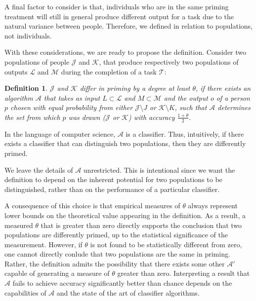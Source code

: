 \documentclass[a4paper]{report}
\newtheorem*{mydef}{Definition}
\begin{document}
A final factor to consider is that, individuals who are in the same priming 
treatment will still in general produce different output for a task
due to the natural variance between people.  Therefore, we defined in relation 
to populations, not individuals.

With these considerations, we are ready to propose the definition.
Consider two populations of people $\mathcal{J}$ and $\mathcal{K}$, that 
produce respectively two populations of outputs 
$\mathcal{L}$ and $\mathcal{M}$ during the completion of a task $\mathcal{T}$: 

\vspace{2mm}
\begin{mydef}
	\upshape
	$\mathcal{J}$ and $\mathcal{K}$ 
	\emph{differ in priming by a degree at least $\theta$},
	if there exists an algorithm $\mathcal{A}$ that takes as input 
	$L \subset \mathcal{L}$ and $M \subset \mathcal{M}$ and the output 
	$o$ of a person $p$ chosen with equal probability from either 
	$\mathcal{J}\setminus J$ or $\mathcal{K}\setminus K$, 
	such that $\mathcal{A}$ determines the set from which $p$ was drawn
	($\mathcal{J}$ or $\mathcal{K}$) with accuracy $\frac{1+\theta}{2}$.  
\end{mydef}

In the language of computer science, $\mathcal{A}$ is a classifier.  Thus,
intuitively, if there exists a classifier that can distinguish two populations,
then they are differently primed.

We leave the details of $\mathcal{A}$ unrestricted.  This is 
intentional since we want the definition to depend on the inherent 
potential for two populations to be distinguished, rather than on the 
performance of a particular classifier.

A consequence of this choice is that empirical measures of $\theta$ always
represent lower bounds on the theoretical value appearing in the definition.
As a result, a measured $\theta$ that is greater than zero directly 
supports the conclusion that two populations are differently 
primed, up to the statistical significance of the measurement.  However, if 
$\theta$ is not found to be statistically different from zero, one cannot 
directly
conlude that two populations are the same in priming.  Rather, the definition
admits the possibility that there exists some other $\mathcal{A}'$ capable of 
generating a measure of $\theta$ greater than zero. Interpreting a result
that $\mathcal{A}$ fails to achieve accuracy significantly better than 
chance depends on the capabilities of $\mathcal{A}$ and the state of the art
of classifier algorithms.
\end{document}
